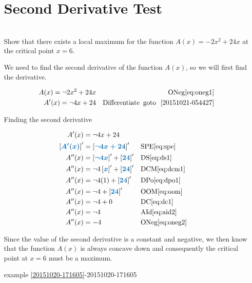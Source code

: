 \documentclass[20150903-160354-rs2.2-MarksMathNotebook.tex]{subfiles}
\begin{document}
%
%

\chapter{Second Derivative Test}


\begin{example}[id:20151021-063855] \label{20151021-063855} \hfill \\
Show that there exists a local maximum for the function $A(x)=-2x^2+24x$ at the critical point $x=6$.

\soln

\solnsteps
We need to find the second derivative of the function $A(x)$, so we will first find the derivative.

\begin{align*}
A(x)=\neg 2x^2+24x && \text{ONeg} \eqref{eq:oneg1} \\
A'(x)=\neg 4x +24  &&\text{Differentiate} \text{\, goto \,} \, \ref{20151021-054427} \\
\end{align*}

Finding the second derivative

\begin{align*}
A'(x) & = \neg 4x +24 \\
\farg{A'(x)}' &= \farg{\neg 4x +24}' && \text{SPE} \eqref{eq:spe} \\
A''(x) &= \farg{\neg 4x}' + \farg{24}' && \text{DS} \eqref{eq:ds1} \\
A''(x) &= \neg 4\farg{x}' + \farg{24}' && \text{DCM} \eqref{eq:dcm1} \\
A''(x) &= \neg 4(1) + \farg{24}' && \text{DPo} \eqref{eq:dpo1} \\
A''(x) &= \neg 4 + \farg{24}' && \text{OOM} \eqref{eq:oom} \\
A''(x) &= \neg 4 + 0 && \text{DC} \eqref{eq:dc1} \\
A''(x) &= \neg 4 && \text{AId} \eqref{eq:aid2} \\
A''(x) &= -4 && \text{ONeg} \eqref{eq:oneg2}
\end{align*}

Since the value of the second derivative is a constant and negative, we then know that the function $A(x)$ is always concave down and consequently the critical point at $x=6$ must be a maximum.

\qdepend

\qdependlist
example \ref{20151020-171605}-20151020-171605


\end{example}
\end{document}

